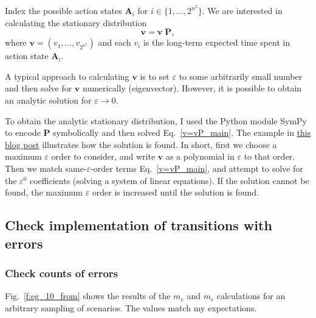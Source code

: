 \documentclass[12pt]{article}
\newcommand{\eps}[0]{\varepsilon}
\begin{document}
Index the possible action states $\boldsymbol{A}_i$ for $i \in \{ 1, \ldots, 2^{n^2} \}$.
We are interested in calculating the stationary distribution
\begin{equation}
    \boldsymbol{v} = \boldsymbol{v} \; \boldsymbol{P},
    \label{v=vP_main}
\end{equation}
where $\boldsymbol{v} = (v_1, \ldots, v_{2^{n^2}})$
and each $v_i$ is the long-term expected time spent in action state $\boldsymbol{A}_i$.

A typical approach to calculating $\boldsymbol{v}$ is to set $\eps$ to some arbitrarily
small number and then solve for $\boldsymbol{v}$ numerically (eigenvector).
However,
it is possible to obtain an analytic solution for $\eps \rightarrow 0$.

To obtain the analytic stationary distribution,
I used the Python module SymPy to encode $\boldsymbol{P}$ symbolically
and then solved Eq.~\ref{v=vP_main}.
The example in 
\href{https://nadiah.org/2025/11/18/analytic-stationary}{this blog post}
illustrates how the solution is found.
In short,
first we choose a maximum $\eps$ order to consider,
and write $\boldsymbol{v}$ as a polynomial in $\eps$ to that order.
Then we match same-$\eps$-order terms Eq.~\ref{v=vP_main},
and attempt to solve for the $\eps^0$ coefficients (solving a system of linear equations).
If the solution cannot be found,
the maximum $\eps$ order is increased until the solution is found.

\clearpage
\subsection{Check implementation of transitions with errors}

\subsubsection{Check counts of errors}

Fig.~\ref{f:eg_10_from} shows the results of the $m_e$ and $m_c$ calculations
for an arbitrary sampling of scenarios.
The values match my expectations.
\end{document}
